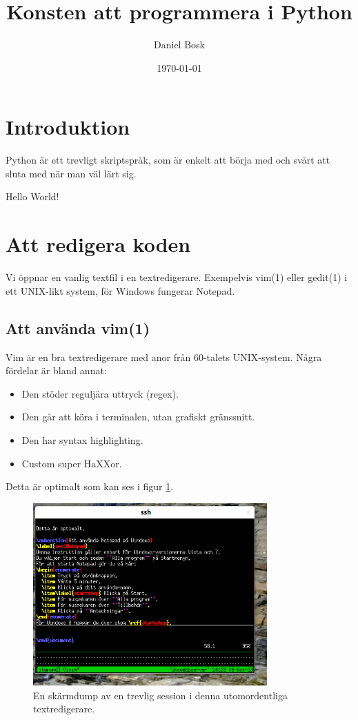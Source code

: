 \documentclass[a4paper]{article}
\author{Daniel Bosk}
\title{Konsten att programmera i Python}
\date{\today}
\begin{document}
\maketitle %
\tableofcontents


\section{Introduktion}
\label{sec:Intro}
Python är ett trevligt skriptspråk, som är enkelt att börja med och svårt att 
sluta med när man väl lärt sig.

Hello World!


\section{Att redigera koden}
\label{sec:Edit}
Vi öppnar en vanlig textfil i en textredigerare.
Exempelvis vim(1) eller gedit(1) i ett UNIX-likt system, för Windows fungerar 
Notepad.

\subsection{Att använda vim(1)}
\label{sec:vim}
Vim är en bra textredigerare med anor från 60-talets UNIX-system.
Några fördelar är bland annat:
\begin{itemize}
  \item Den stöder reguljära uttryck (regex).
  \item Den går att köra i terminalen, utan grafiskt gränssnitt.
  \item Den har syntax highlighting.
  \item Custom super HaXXor.
\end{itemize}

Detta är optimalt som kan ses i figur \ref{fig:vim}.
\begin{figure}
  \centering
  \includegraphics[height=7cm]{vim.png}
  \caption{En skärmdump av en trevlig session i denna utomordentliga 
  textredigerare.}
  \label{fig:vim}
\end{figure}
\end{document}
